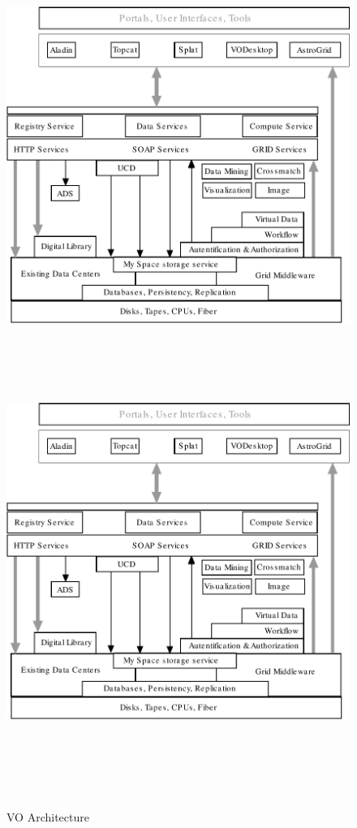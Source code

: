     \begin{figure}[!htbp]
      \begin{center}
        \leavevmode
        \ifpdf
        \includegraphics[scale =.6]{architecture}
        \else
        \includegraphics[bb = 92 86 545 742, height=6in]{architecture}
        \fi
        \caption{VO Architecture}
        \label{FigArchitecture}
      \end{center}
    \end{figure}

